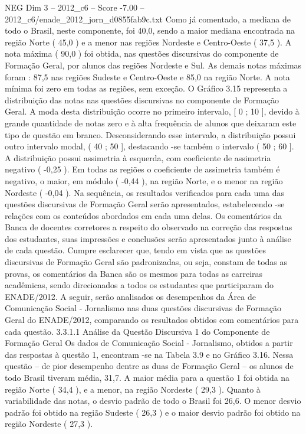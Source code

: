 \begin{textsample}{NEG Dim 3 – 2012\_c6 – Score -7.00 – 2012\_c6/enade\_2012\_jorn\_d0855fab9c.txt}
Como já comentado, a mediana de todo o Brasil, neste componente, foi 40,0, sendo a maior mediana encontrada na região Norte ( 45,0 ) e a menor nas regiões Nordeste e Centro-Oeste ( 37,5 ).
A nota máxima ( 90,0 ) foi obtida, nas questões discursivas do componente de Formação Geral, por alunos das regiões Nordeste e Sul.
As demais notas máximas foram : 87,5 nas regiões Sudeste e Centro-Oeste e 85,0 na região Norte.
A nota mínima foi zero em todas as regiões, sem exceção.
O Gráfico 3.15 representa a distribuição das notas nas questões discursivas no componente de Formação Geral.
A moda desta distribuição ocorre no primeiro intervalo, [ 0 ; 10 ], devido à grande quantidade de notas zero e à alta frequência de alunos que deixaram este tipo de questão em branco.
Desconsiderando esse intervalo, a distribuição possui outro intervalo modal, ( 40 ; 50 ], destacando -se também o intervalo ( 50 ; 60 ].
A distribuição possui assimetria à esquerda, com coeficiente de assimetria negativo ( -0,25 ).
Em todas as regiões o coeficiente de assimetria também é negativo, o maior, em módulo ( -0,44 ), na região Norte, e o menor na região Nordeste ( -0,04 ).
Na sequência, os resultados verificados para cada uma das questões discursivas de Formação Geral serão apresentados, estabelecendo -se relações com os conteúdos abordados em cada uma delas.
Os comentários da Banca de docentes corretores a respeito do observado na correção das respostas dos estudantes, suas impressões e conclusões serão apresentados junto à análise de cada questão.
Cumpre esclarecer que, tendo em vista que as questões discursivas de Formação Geral são padronizadas, ou seja, constam de todas as provas, os comentários da Banca são os mesmos para todas as carreiras acadêmicas, sendo direcionados a todos os estudantes que participaram do ENADE/2012.
A seguir, serão analisados os desempenhos da Área de Comunicação Social - Jornalismo nas duas questões discursivas de Formação Geral do ENADE/2012, comparando os resultados obtidos com comentários para cada questão. 3.3.1.1 Análise da Questão Discursiva 1 do Componente de Formação Geral Os dados de Comunicação Social - Jornalismo, obtidos a partir das respostas à questão 1, encontram -se na Tabela 3.9 e no Gráfico 3.16.
Nessa questão – de pior desempenho dentre as duas de Formação Geral – os alunos de todo Brasil tiveram média, 31,7.
A maior média para a questão 1 foi obtida na região Norte ( 34,4 ), e a menor, na região Nordeste ( 29,3 ).
Quanto à variabilidade das notas, o desvio padrão de todo o Brasil foi 26,6.
O menor desvio padrão foi obtido na região Sudeste ( 26,3 ) e o maior desvio padrão foi obtido na região Nordeste ( 27,3 ).

\end{textsample}
